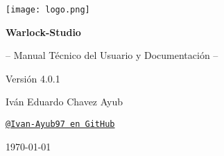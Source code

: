 \documentclass[11pt, a4paper]{article}
\begin{document}
\begin{titlepage}
    \begin{tcolorbox}[
        colback=WarlockDark,                    %
        colframe=WarlockGold,                   %
        sharp corners,                          %
        boxrule=1.5pt,                          %
        halign=center,                          %
        valign=center,                          %
        height=\dimexpr\textheight-1cm\relax    %
      ]
      \centering %

      \texttt{[image: logo.png]}\par %

      \vfill %

      \color{white} %

      {\Huge\bfseries Warlock-Studio\par}
      \vspace{0.7cm} %
      {\Large -- Manual Técnico del Usuario y Documentación --\par}
      \vspace{0.2cm}
      {\Large Versión 4.0.1\par}

      \vfill %

      {\large Iván Eduardo Chavez Ayub\par}
      \href{https://github.com/Ivan-Ayub97}{\texttt{\color{WarlockGold}@Ivan-Ayub97 en GitHub}}\par %

      \vspace{1.5cm}

      {\large \today\par} %
    \end{tcolorbox}
    \thispagestyle{empty} %
\end{titlepage}
\end{document}
